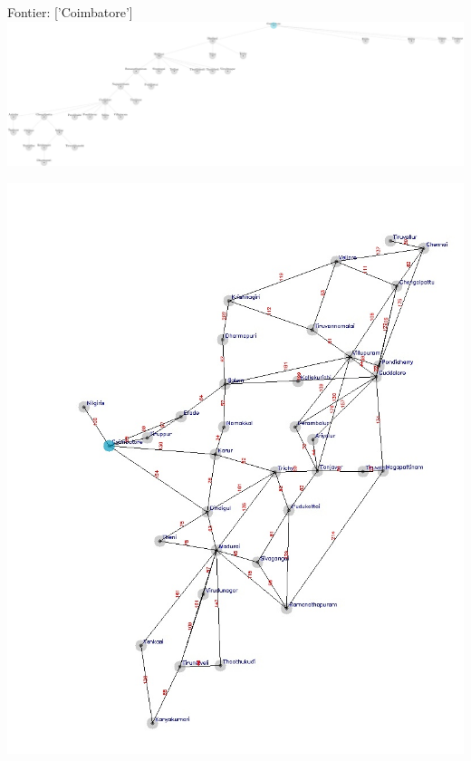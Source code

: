 \documentclass[xcolor=table]{beamer}
\begin{document}
\begin{frame}
  { \tiny Fontier: ['Coimbatore'] }
  \includegraphics[width=1\textwidth]{../DFSNodes/2-1.png}
  \begin{center}
    \includegraphics[height=0.5\textheight]{../DFSoutput/tamilDFS0.jpg}
  \end{center}
\end{frame}
\end{document}
